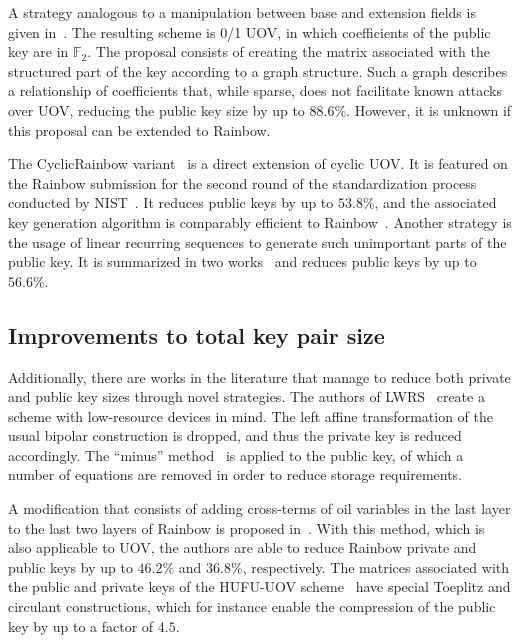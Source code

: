 \documentclass[12pt, a4paper, oneside]{memoir}
\theoremstyle{definition}
\begin{document}
A strategy analogous to a manipulation between base and extension fields is given in~\cite{Petzoldt:201109}. The resulting scheme is 0/1 UOV, in which coefficients of the public key are in $\mathbb{F}_{2}$. The proposal consists of creating the matrix associated with the structured part of the key according to a graph structure. Such a graph describes a relationship of coefficients that, while sparse, does not facilitate known attacks over UOV, reducing the public key size by up to $88.6\%$. However, it is unknown if this proposal can be extended to Rainbow.

The CyclicRainbow variant~\cite{Petzoldt:201012} is a direct extension of cyclic UOV. It is featured on the Rainbow submission for the second round of the standardization process conducted by NIST~\cite{Ding:201901}. It reduces public keys by up to $53.8\%$, and the associated key generation algorithm is comparably efficient to Rainbow~\cite{Petzoldt:202004}. Another strategy is the usage of linear recurring sequences to generate such unimportant parts of the public key. It is summarized in two works~\cite{Petzoldt:201103,Petzoldt:201211} and reduces public keys by up to $56.6\%$.

\subsection{Improvements to total key pair size}\label{subsec:both}

Additionally, there are works in the literature that manage to reduce both private and public key sizes through novel strategies. The authors of LWRS~\cite{Zhang:201208} create a scheme with low-resource devices in mind. The left affine transformation of the usual bipolar construction is dropped, and thus the private key is reduced accordingly. The ``minus'' method~\cite[Sec.~3.2.1]{Wolf:200511} is applied to the public key, of which a number of equations are removed in order to reduce storage requirements.

A modification that consists of adding cross-terms of oil variables in the last layer to the last two layers of Rainbow is proposed in~\cite{Tan:201603}. With this method, which is also applicable to UOV, the authors are able to reduce Rainbow private and public keys by up to $46.2\%$ and $36.8\%$, respectively. The matrices associated with the public and private keys of the HUFU-UOV scheme~\cite{Tao:201905} have special Toeplitz and circulant constructions, which for instance enable the compression of the public key by up to a factor of $4.5$.
\end{document}
